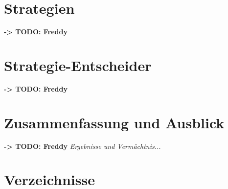 \documentclass[fontsize=12pt,a4paper,final]{scrartcl}[2003/01/01]
\begin{document}
\section{Strategien}
\textbf{-> TODO: Freddy}
\section{Strategie-Entscheider}
\textbf{-> TODO: Freddy}
\section{Zusammenfassung und Ausblick}
\textbf{-> TODO: Freddy}
\textit{Ergebnisse und Vermächtnis...}

\section{Verzeichnisse}
\listoffigures

\lstlistoflistings
\end{document}

